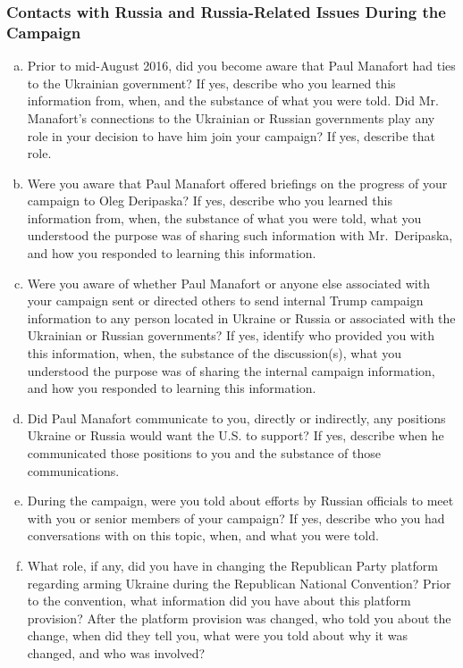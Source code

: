 \subsubsection{Contacts with Russia and Russia-Related Issues During the Campaign}

\begin{enumerate}[a.]

\item Prior to mid-August 2016, did you become aware that Paul Manafort had ties to the Ukrainian government?
If yes, describe who you learned this information from, when, and the substance of what you were told.
Did Mr. Manafort's connections to the Ukrainian or Russian governments play any role in your decision to have him join your campaign?
If yes, describe that role.

\item Were you aware that Paul Manafort offered briefings on the progress of your campaign to Oleg Deripaska?
If yes, describe who you learned this information from, when, the substance of what you were told, what you understood the purpose was of sharing such information with Mr.~Deripaska, and how you responded to learning this information.

\item Were you aware of whether Paul Manafort or anyone else associated with your campaign sent or directed others to send internal Trump campaign information to any person located in Ukraine or Russia or associated with the Ukrainian or Russian governments?
If yes, identify who provided you with this information, when, the substance of the discussion(s), what you understood the purpose was of sharing the internal campaign information, and how you responded to learning this information.

\item Did Paul Manafort communicate to you, directly or indirectly, any positions Ukraine or Russia would want the U.S. to support?
If yes, describe when he communicated those positions to you and the substance of those communications.

\item During the campaign, were you told about efforts by Russian officials to meet with you or senior members of your campaign?
If yes, describe who you had conversations with on this topic, when, and what you were told.

\item What role, if any, did you have in changing the Republican Party platform regarding arming Ukraine during the Republican National Convention?
Prior to the convention, what information did you have about this platform provision?
After the platform provision was changed, who told you about the change, when did they tell you, what were you told about why it was changed, and who was involved?


\end{enumerate}
